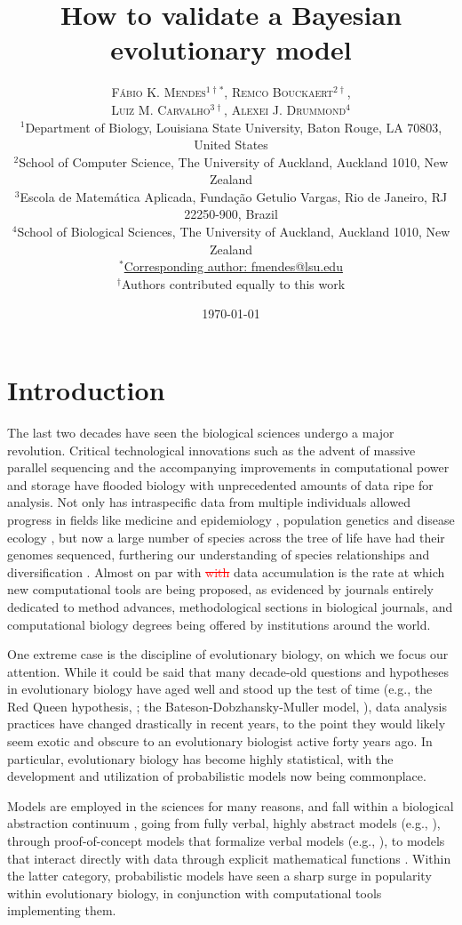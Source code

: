 \documentclass[oneside]{article}
\title{How to validate a Bayesian evolutionary model} %
\author{\textsc{F\'{a}bio K. Mendes$^{1\dagger*}$}, \textsc{Remco Bouckaert$^{2\dagger}$},\\
\textsc{Luiz M. Carvalho$^{3\dagger}$}, \textsc{Alexei J. Drummond$^{4}$} \\
\small $^1$Department of Biology, Louisiana State University, Baton Rouge, LA 70803, United States\\
\small $^2$School of Computer Science, The University of Auckland, Auckland 1010, New Zealand\\
\small $^3$Escola de Matem\'{a}tica Aplicada, Fundaç\~{a}o Getulio Vargas, Rio de Janeiro, RJ 22250-900, Brazil\\
\small $^4$School of Biological Sciences, The University of Auckland, Auckland 1010, New Zealand\\
\small
\href{mailto:fmendes@lsu.edu}{$^*$Corresponding author: fmendes@lsu.edu}\\
{\small $^\dagger$Authors contributed equally to this work}
}
\date{\today} %
\begin{document}
\maketitle


\section*{Introduction}
The last two decades have seen the biological sciences undergo a major revolution.
Critical technological innovations such as the advent of massive parallel sequencing and the accompanying improvements in computational power and storage have flooded biology with unprecedented amounts of data ripe for analysis.
Not only has intraspecific data from multiple individuals allowed progress in fields like medicine and epidemiology \citep[e.g.,][]{1000g,humanmicrobiome,neafsey15}, population genetics \citep[e.g.,][]{lynch07,lack16,demanuel16} and disease ecology \citep[e.g.,][]{rosenblum13,bates18}, but now a large number of species across the tree of life have had their genomes sequenced, furthering our understanding of species relationships and diversification \citep[e.g.,][]{pease2016,kawahara19,upham19}.
Almost on par with \textcolor{red}{\st{with}} data accumulation is the rate at which new computational tools are being proposed, as evidenced by journals entirely dedicated to method advances, methodological sections in biological journals, and computational biology degrees being offered by institutions around the world.

One extreme case is the discipline of evolutionary biology, on which we focus our attention.
While it could be said that many decade-old questions and hypotheses in evolutionary biology have aged well and stood up the test of time (e.g., the Red Queen hypothesis, \citealt{vanvalen73,lively87,morran11,gibson15}; the Bateson-Dobzhansky-Muller model, \citealt{dob36,muller40,hopkins12,roda17}),
data analysis practices have changed drastically in recent years, to the point they would likely seem exotic and obscure to an evolutionary biologist active forty years ago. 
In particular, evolutionary biology has become highly statistical, with the development and utilization of probabilistic models now being commonplace.

Models are employed in the sciences for many reasons, and fall within a biological abstraction continuum \citep{servedio14}, going from fully verbal, highly abstract models (e.g., \citealt{vanvalen73}), through proof-of-concept models that formalize verbal models (e.g., \citealt{maynard78,reinhold99}), to models that interact directly with data through explicit mathematical functions \citep{yule24,fel73,hky,hudson90}.
Within the latter category, probabilistic models have seen a sharp surge in popularity within evolutionary biology, in conjunction with computational tools implementing them.
\end{document}
